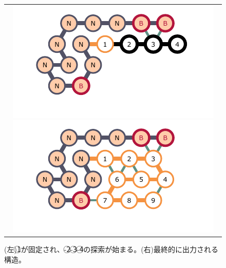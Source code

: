 \documentclass[a4,11pt]{article}
\begin{document}
\begin{center}
\begin{figure}[h]
\centering
\begin{tabular}{c}

\begin{minipage}{0.33\hsize}
\centering
	\includegraphics[width=\textwidth]{fig/svg/confex2_2.pdf}
\end{minipage}

\begin{minipage}{0.33\hsize}
\centering
	\includegraphics[width=\textwidth]{fig/svg/confex2_3.pdf}
\end{minipage}

\end{tabular}
\caption{(左)\textcircled{\scriptsize 1}が固定され、{-}\textcircled{\scriptsize 2}{-}\textcircled{\scriptsize 3}{-}\textcircled{\scriptsize 4}の探索が始まる。(右)最終的に出力される構造。}
\label{fig:glider2_02}
\end{figure}
\end{center}
\end{document}

